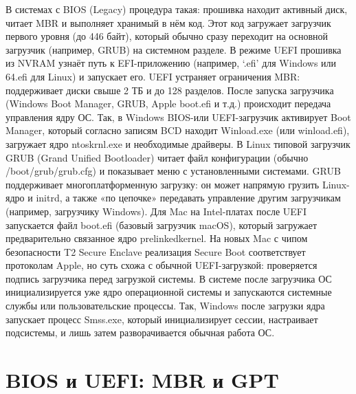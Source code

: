В системах с BIOS (Legacy) процедура такая: прошивка находит активный
диск, читает MBR и выполняет хранимый в нём код. Этот код загружает
загрузчик первого уровня (до 446 байт), который обычно сразу переходит
на основной загрузчик (например, GRUB) на системном разделе. В режиме
UEFI прошивка из NVRAM узнаёт путь к EFI-приложению (например,
`\EFI\Microsoft\Boot\bootmgfw.efi' для Windows или
\EFI\ubuntu\grubx64.efi для Linux) и запускает его. UEFI устраняет
ограничения MBR: поддерживает диски свыше 2 ТБ и до 128 разделов. После
запуска загрузчика (Windows Boot Manager, GRUB, Apple boot.efi и т.д.)
происходит передача управления ядру ОС. Так, в Windows BIOS-или
UEFI-загрузчик активирует Boot Manager, который согласно записям BCD
находит Winload.exe (или winload.efi), загружает ядро ntoskrnl.exe и
необходимые драйверы. В Linux типовой загрузчик GRUB (Grand Unified
Bootloader) читает файл конфигурации (обычно /boot/grub/grub.cfg) и
показывает меню с установленными системами. GRUB поддерживает
многоплатформенную загрузку: он может напрямую грузить Linux-ядро и
initrd, а также «по цепочке» передавать управление другим загрузчикам
(например, загрузчику Windows). Для Mac на Intel-платах после UEFI
запускается файл boot.efi (базовый загрузчик macOS), который загружает
предварительно связанное ядро prelinkedkernel. На новых Mac с чипом
безопасности T2 Secure Enclave реализация Secure Boot соответствует
протоколам Apple, но суть схожа с обычной UEFI-загрузкой: проверяется
подпись загрузчика перед загрузкой системы. В системе после загрузчика
ОС инициализируется уже ядро операционной системы и запускаются
системные службы или пользовательские процессы. Так, Windows после
загрузки ядра запускает процесс Smss.exe, который инициализирует сессии,
настраивает подсистемы, и лишь затем разворачивается обычная работа ОС.

\hypertarget{bios-ux438-uefi-mbr-ux438-gpt}{%
\chapter{BIOS и UEFI: MBR и GPT}\label{bios-ux438-uefi-mbr-ux438-gpt}}

